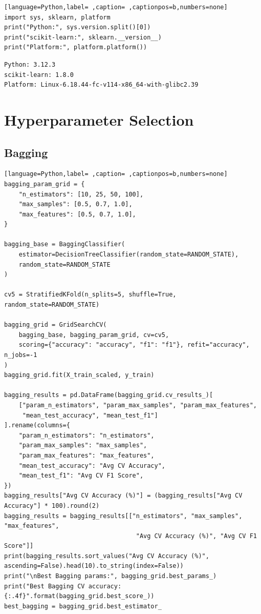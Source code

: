 \documentclass[12pt,a4paper]{article}
\begin{document}
\begin{lstlisting}[language=Python,label= ,caption= ,captionpos=b,numbers=none]
import sys, sklearn, platform
print("Python:", sys.version.split()[0])
print("scikit-learn:", sklearn.__version__)
print("Platform:", platform.platform())
\end{lstlisting}

\begin{verbatim}
Python: 3.12.3
scikit-learn: 1.8.0
Platform: Linux-6.18.44-fc-v114-x86_64-with-glibc2.39
\end{verbatim}

\section{Hyperparameter Selection}
\label{sec:orgf27e361}

\subsection{Bagging}
\label{sec:org8cd83b9}
\begin{lstlisting}[language=Python,label= ,caption= ,captionpos=b,numbers=none]
bagging_param_grid = {
    "n_estimators": [10, 25, 50, 100],
    "max_samples": [0.5, 0.7, 1.0],
    "max_features": [0.5, 0.7, 1.0],
}

bagging_base = BaggingClassifier(
    estimator=DecisionTreeClassifier(random_state=RANDOM_STATE),
    random_state=RANDOM_STATE
)

cv5 = StratifiedKFold(n_splits=5, shuffle=True, random_state=RANDOM_STATE)

bagging_grid = GridSearchCV(
    bagging_base, bagging_param_grid, cv=cv5,
    scoring={"accuracy": "accuracy", "f1": "f1"}, refit="accuracy", n_jobs=-1
)
bagging_grid.fit(X_train_scaled, y_train)

bagging_results = pd.DataFrame(bagging_grid.cv_results_)[
    ["param_n_estimators", "param_max_samples", "param_max_features",
     "mean_test_accuracy", "mean_test_f1"]
].rename(columns={
    "param_n_estimators": "n_estimators",
    "param_max_samples": "max_samples",
    "param_max_features": "max_features",
    "mean_test_accuracy": "Avg CV Accuracy",
    "mean_test_f1": "Avg CV F1 Score",
})
bagging_results["Avg CV Accuracy (%)"] = (bagging_results["Avg CV Accuracy"] * 100).round(2)
bagging_results = bagging_results[["n_estimators", "max_samples", "max_features",
                                    "Avg CV Accuracy (%)", "Avg CV F1 Score"]]
print(bagging_results.sort_values("Avg CV Accuracy (%)", ascending=False).head(10).to_string(index=False))
print("\nBest Bagging params:", bagging_grid.best_params_)
print("Best Bagging CV accuracy: {:.4f}".format(bagging_grid.best_score_))
best_bagging = bagging_grid.best_estimator_
\end{lstlisting}
\end{document}
